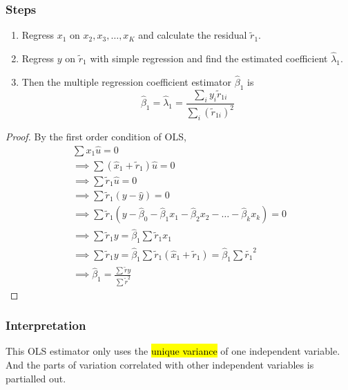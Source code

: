 \documentclass[]{article}
\begin{document}
    \subsubsection{Steps}
        \begin{enumerate}
            \item Regress $x_1$ on $x_2, x_3, \dots, x_K$ and calculate the residual $\widetilde{r}_1$. 
            \item Regress $y$ on $\widetilde{r}_1$ with simple regression and find the estimated coefficient $\hat{\lambda}_1$.
            \item Then the multiple regression coefficient estimator $\hat{\beta}_1$ is
            \[
                \hat{\beta}_1 = \hat{\lambda}_1 = \frac{\sum_{i}{y_i \widetilde{r}_{1i}}}{\sum_i {(\widetilde{r}_{1i})^2}}
            \]
        \end{enumerate}
        \begin{proof}
        	By the first order condition of OLS,
        	\begin{gather*}
        		\sum x_1 \hat{u} = 0 \\
        		\implies \sum (\hat{x}_1 + \tilde{r}_1) \hat{u} = 0 \\
        		\implies \sum \tilde{r}_1 \hat{u} = 0 \\
        		\implies \sum \tilde{r}_1 (y - \hat{y}) = 0 \\
        		\implies \sum \tilde{r}_1 (y - \hat{\beta}_0 - \hat{\beta}_1 x_1 - \hat{\beta}_2 x_2 - \dots - \hat{\beta}_k x_k) = 0 \\
        		\implies \sum \tilde{r}_1 y = \hat{\beta}_1 \sum \tilde{r}_1 x_1 \\
        		\implies \sum \tilde{r}_1 y = \hat{\beta}_1 \sum \tilde{r}_1 (\hat{x}_1 + \tilde{r}_1) = \hat{\beta}_1 \sum \tilde{r_1}^2\\
        		\implies \hat{\beta}_1 = \frac{\sum \tilde{r} y}{\sum \tilde{r}^2}
        	\end{gather*}
        \end{proof}
        
    \subsubsection{Interpretation}
    \par This OLS estimator only uses the \hl{unique variance} of one independent variable. And the parts of variation correlated with other independent variables is partialled out.
    
\end{document}
